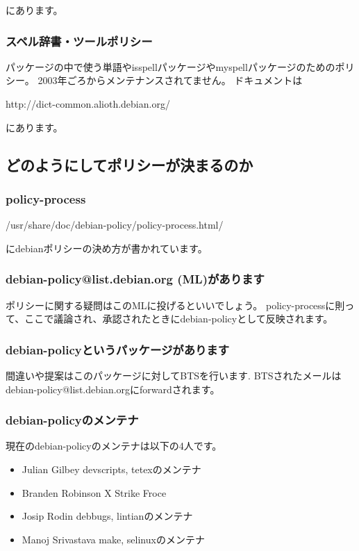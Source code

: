 \documentclass[mingoth,a4paper]{jsarticle}
\begin{document}
        にあります。

    \subsubsection{スペル辞書・ツールポリシー}
        パッケージの中で使う単語やisspellパッケージやmyspellパッケージのためのポリシー。
        2003年ごろからメンテナンスされてません。
	ドキュメントは

	http://dict-common.alioth.debian.org/

	にあります。
\subsection{どのようにしてポリシーが決まるのか}

    \subsubsection{policy-process}
        /usr/share/doc/debian-policy/policy-process.html/

        にdebianポリシーの決め方が書かれています。

    \subsubsection{debian-policy@list.debian.org (ML)があります}
        ポリシーに関する疑問はこのMLに投げるといいでしょう。
        policy-processに則って、ここで議論され、承認されたときにdebian-policyとして反映されます。

    \subsubsection{debian-policyというパッケージがあります}
        間違いや提案はこのパッケージに対してBTSを行います.
        BTSされたメールはdebian-policy@list.debian.orgにforwardされます。

    \subsubsection{debian-policyのメンテナ}
        現在のdebian-policyのメンテナは以下の4人です。

    \begin{itemize}
        \item Julian Gilbey
            devscripts, tetexのメンテナ
        \item Branden Robinson
            X Strike Froce
        \item Josip Rodin
            debbugs, lintianのメンテナ
        \item Manoj Srivastava
            make, selinuxのメンテナ
    \end{itemize}
\end{document}
